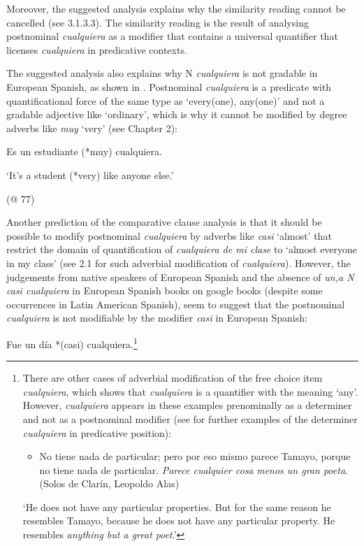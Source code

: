   Moreover, the suggested analysis explains why the similarity reading cannot be cancelled (see 3.1.3.3). The similarity reading is the result of analysing postnominal \textit{cualquiera} as a modifier that contains a universal quantifier that licenses \textit{cualquiera} in predicative contexts. 

  The suggested analysis also explains why N \textit{cualquiera} is not gradable in European Spanish, as shown in . Postnominal \textit{cualquiera} is a predicate with quantificational force of the same type as ‘every(one), any(one)’ and not a gradable adjective like ‘ordinary’, which is why it cannot be modified by degree adverbs like \textit{muy} ‘very’ (see Chapter 2):

\label{bkm:Ref58074686}  Es un estudiante (*muy) cualquiera.   

  ‘It’s a student (*very) like anyone else.’

  (@ 77)

Another prediction of the comparative clause analysis is that it should be possible to modify postnominal \textit{cualquiera} by adverbs like \textit{casi} ‘almost’ that restrict the domain of quantification of \textit{cualquiera de mi clase} to ‘almost everyone in my class’ (see 2.1 for such adverbial modification of \textit{cualquiera}). However, the judgements from native speakers of European Spanish and the absence of \textit{un,a N casi cualquiera} in European Spanish books on google books (despite some occurrences in Latin American Spanish), seem to suggest that the postnominal \textit{cualquiera} is not modifiable by the modifier \textit{casi} in European Spanish:

  Fue un día *(casi) cualquiera.\footnote{{There are other cases of adverbial modification of the free choice item} {\textit{cualquiera}}{, which shows that} {\textit{cualquiera}} {is a quantifier with the meaning ‘any’. However,} {\textit{cualquiera}} {appears in these examples prenominally as a determiner and not as a postnominal modifier (see  for further examples of the determiner} {\textit{cualquiera}} {in predicative position):}

\begin{itemize}
\item
{No tiene nada de particular; pero por eso mismo parece Tamayo, porque no tiene nada de particular.} {\textit{Parece cualquier cosa}} {\textit{menos un gran poeta}}{. (Solos de Clarín, Leopoldo Alas)}
\end{itemize}
{‘He does not have any particular properties. But for the same reason he resembles Tamayo, because he does not have any particular property. He resembles} {\textit{anything but a great poet}}{.’}}

